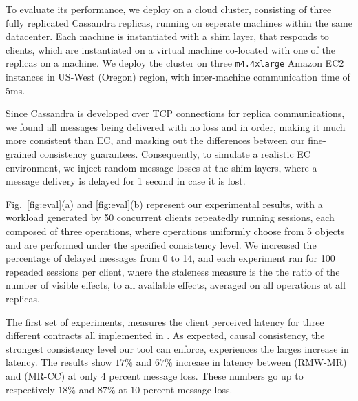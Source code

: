 To evaluate its performance, we deploy \tool on a cloud cluster,
consisting of three fully replicated Cassandra replicas, running on
seperate machines within the same
datacenter. 
Each machine is instantiated with a
\tool shim layer, that responds to clients,  
 which are instantiated on a virtual machine 
co-located with one of the replicas on a machine.
We deploy the cluster on three \texttt{m4.4xlarge} Amazon EC2 instances
in US-West (Oregon) region, with inter-machine communication time of 5ms.

Since Cassandra is developed over TCP connections for replica communications, 
we found all messages being  delivered with no loss and in order, making
it much more consistent  than  EC, and masking out the
differences between our fine-grained consistency guarantees.
Consequently, to simulate a
realistic EC environment, we inject random message losses at the shim
layers, where a message delivery is delayed for 1
second in case it is lost.

Fig.~\ref{fig:eval}(a) and \ref{fig:eval}(b) represent
our experimental results, with a workload generated 
by 50 concurrent clients repeatedly running sessions, each composed of three
operations, where operations uniformly choose from 5 objects and are
performed under the specified consistency level. 
We increased the
percentage of delayed messages from 0 to 14, and each experiment ran for
100 repeaded sessions per client, where the staleness measure is the
the ratio of the number of visible effects, 
to all available effects, averaged on all operations at all
replicas.

The first set of experiments, measures the client perceived latency for
three different \LB{} contracts all implemented in \tool. As expected,
causal consistency, the strongest consistency level our tool can
enforce,  experiences the larges increase in latency. The results show
$17\%$ and $67\%$ increase in latency between (RMW-MR) and (MR-CC) at only
$4$ percent message loss. These numbers go up to respectively $18\%$ and
$87\%$ at $10$ percent message loss.

















































